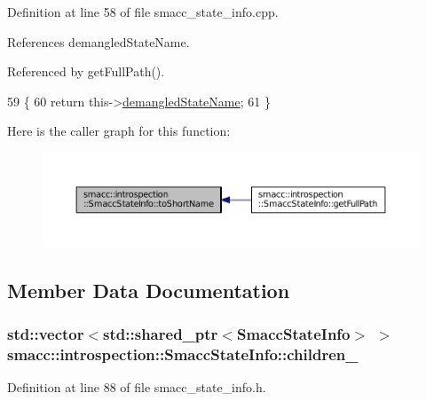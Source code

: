 Definition at line 58 of file smacc\+\_\+state\+\_\+info.\+cpp.



References demangled\+State\+Name.



Referenced by get\+Full\+Path().


\begin{DoxyCode}
59 \{
60     \textcolor{keywordflow}{return} this->\hyperlink{classsmacc_1_1introspection_1_1SmaccStateInfo_acf0014a819c23caad085ba6df13a17bf}{demangledStateName};
61 \}
\end{DoxyCode}


Here is the caller graph for this function\+:
\nopagebreak
\begin{figure}[H]
\begin{center}
\leavevmode
\includegraphics[width=350pt]{classsmacc_1_1introspection_1_1SmaccStateInfo_aa43c3733427618a141c3f6803913a88b_icgraph}
\end{center}
\end{figure}




\subsection{Member Data Documentation}
\subsubsection[{\texorpdfstring{children\+\_\+}{children_}}]{\setlength{\rightskip}{0pt plus 5cm}std\+::vector$<$std\+::shared\+\_\+ptr$<${\bf Smacc\+State\+Info}$>$ $>$ smacc\+::introspection\+::\+Smacc\+State\+Info\+::children\+\_\+}\hypertarget{classsmacc_1_1introspection_1_1SmaccStateInfo_a73eac049e8149b6eaeec735101c32ef9}{}\label{classsmacc_1_1introspection_1_1SmaccStateInfo_a73eac049e8149b6eaeec735101c32ef9}


Definition at line 88 of file smacc\+\_\+state\+\_\+info.\+h.



